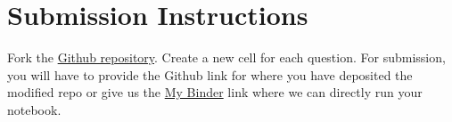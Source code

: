 \documentclass[addpoints]{exam}
\begin{document}
\section*{Submission Instructions}
Fork the \href{https://github.com/hasantahir/HFCS_lecture}{Github repository}. Create a new cell for each question. For submission, you will have to provide the Github link for where you have deposited the modified repo or give us the \href{https://mybinder.org/}{My Binder} link where we can directly run your notebook.
\end{document}

